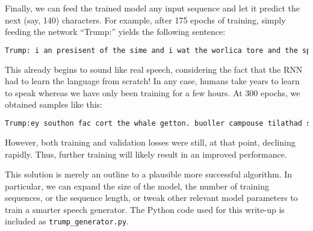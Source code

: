 \documentclass{article}
\begin{document}
\begin{remark}
Finally, we can feed the trained model any input sequence and let it predict the next (say, 140) characters. For example, after 175 epochs of training, simply feeding the network ``Trump:'' yields the following sentence:
\begin{lstlisting}[language=TeX,breaklines=True]
Trump: i an presisent of the sime and i wat the worlica tore and the spaising our componitien and i wat of the spared the worled the worle and the spaiting our communitien
\end{lstlisting}
This already begins to sound like real speech, considering the fact that the RNN had to learn the language from scratch! In any case, humans take years to learn to speak whereas we have only been training for a few hours. At 300 epochs, we obtained samples like this:
\begin{lstlisting}[language=TeX,breaklines=True]
Trump:ey southon fac cort the whale getton. buoller campouse tilathad sumplee ours dousting to beokew athing the semerica ince forette. [applause]
\end{lstlisting}
However, both training and validation losses were still, at that point, declining rapidly. Thus, further training will likely result in an improved performance.

This solution is merely an outline to a plausible more successful algorithm. In particular, we can expand the size of the model, the number of training sequences, or the sequence length, or tweak other relevant model parameters to train a smarter speech generator. The Python code used for this write-up is included as \verb|trump_generator.py|.

\end{remark}
\end{document}
